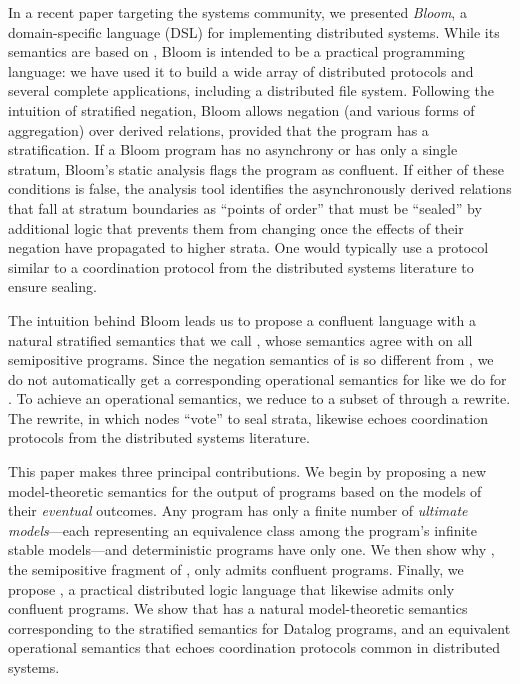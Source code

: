 In a recent paper targeting the systems community, we presented \emph{Bloom}, a domain-specific language (DSL) for implementing distributed 
systems.  While its semantics are based on \lang, Bloom is intended to be a practical programming language: we have used it to build a wide array of distributed protocols and several complete
applications, including a distributed file system.
Following the intuition of stratified negation, Bloom allows negation (and various forms of aggregation) over derived relations, provided that the program has a stratification.
If a Bloom program has no asynchrony or has only a single stratum, Bloom's static analysis flags the 
program as confluent.  If either of these conditions is false, the analysis tool identifies the asynchronously derived relations that fall 
at stratum boundaries as ``points of order'' that must be ``sealed'' by additional logic that prevents them from changing once the effects 
of their negation have propagated to higher strata.  One would typically use a protocol similar to a coordination protocol from the distributed systems literature to ensure sealing.

The intuition behind Bloom leads us to propose a confluent language with a natural stratified semantics that we call \plang, whose semantics agree with \slang on all semipositive \lang programs.  Since the negation semantics of \plang is so different from \lang, we do not automatically get a corresponding operational semantics for \plang like we do for \slang.  To achieve an operational semantics, we reduce \plang to a subset of \lang through a rewrite.  The rewrite, in which nodes ``vote'' to seal strata, likewise echoes coordination protocols from the distributed systems literature.

This paper makes three principal contributions.  We begin by proposing a new model-theoretic semantics for the output of \dedalus 
programs based on the models of their \emph{eventual} outcomes.  
Any \lang program has only a finite number of \emph{ultimate models}---each representing an equivalence class among the program's infinite stable
models---and deterministic programs have only one.
We then show why \slang, the semipositive fragment of \lang, only admits confluent programs.  Finally, we propose \plang, a practical distributed logic language that likewise admits only confluent programs.
We show that \plang has a natural model-theoretic semantics corresponding to the stratified semantics for Datalog programs, and an equivalent operational semantics that echoes coordination protocols common in distributed systems.
